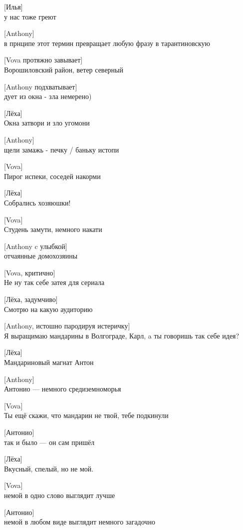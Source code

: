 [Илья]\\
у нас тоже греют


[Anthony]\\
в прнципе этот термин превращает любую фразу в тарантиновскую


[Vova протяжно завывает]\\
Ворошиловский район, ветер северный


[Anthony подхватывает]\\
дует из окна - зла немерено)


[Лёха]\\
Окна затвори и зло угомони


[Anthony]\\
щели замажь - печку / баньку истопи


[Vova]\\
Пирог испеки, соседей накорми


[Лёха]\\
Собрались хозяюшки!


[Vova]\\
Студень замути, немного накати


[Anthony c улыбкой]\\
отчаянные домохозяины


[Vova, критично]\\
Не ну так себе затея для сериала


[Лёха, задумчиво]\\
Смотрю на какую аудиторию


[Anthony, истошно пародируя истеричку]\\
Я выращимаю мандарины в Волгограде, Карл, a ты говоришь так себе идея?


[Лёха]\\
Мандариновый магнат Антон


[Anthony]\\
Антонио --- немного средиземноморья


[Vova]\\
Ты ещё скажи, что мандарин не твой, тебе подкинули


[Антонио]\\
так и было --- он сам пришёл


[Лёха]\\
Вкусный, спелый, но не мой.


[Vova]\\
немой в одно слово выглядит лучше


[Антонио]\\
немой в любом виде выглядит немного загадочно



